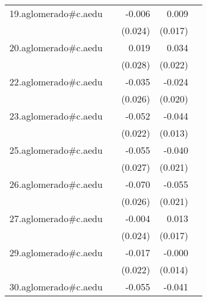 {\begin{longtable}{l*{4}{D{.}{.}{-1}}}
\addlinespace
19.aglomerado#c.aedu&                     &      -0.006         &       0.009         &                     \\
            &                     &     (0.024)         &     (0.017)         &                     \\
\addlinespace
20.aglomerado#c.aedu&                     &       0.019         &       0.034         &                     \\
            &                     &     (0.028)         &     (0.022)         &                     \\
\addlinespace
22.aglomerado#c.aedu&                     &      -0.035         &      -0.024         &                     \\
            &                     &     (0.026)         &     (0.020)         &                     \\
\addlinespace
23.aglomerado#c.aedu&                     &      -0.052\sym{*}  &      -0.044\sym{***}&                     \\
            &                     &     (0.022)         &     (0.013)         &                     \\
\addlinespace
25.aglomerado#c.aedu&                     &      -0.055\sym{*}  &      -0.040         &                     \\
            &                     &     (0.027)         &     (0.021)         &                     \\
\addlinespace
26.aglomerado#c.aedu&                     &      -0.070\sym{**} &      -0.055\sym{**} &                     \\
            &                     &     (0.026)         &     (0.021)         &                     \\
\addlinespace
27.aglomerado#c.aedu&                     &      -0.004         &       0.013         &                     \\
            &                     &     (0.024)         &     (0.017)         &                     \\
\addlinespace
29.aglomerado#c.aedu&                     &      -0.017         &      -0.000         &                     \\
            &                     &     (0.022)         &     (0.014)         &                     \\
\addlinespace
30.aglomerado#c.aedu&                     &      -0.055\sym{*}  &      -0.041\sym{*}  &                     \\

\end{longtable}}

